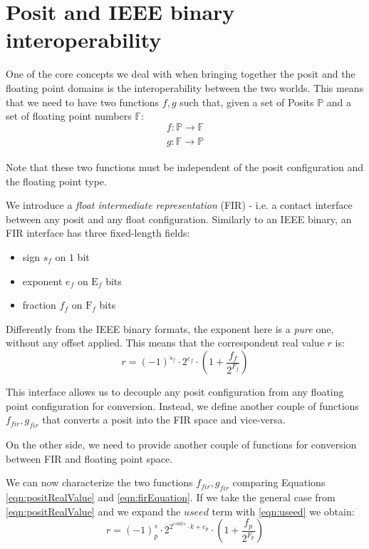 \section{Posit and IEEE binary interoperability}\label{sec:fir}

One of the core concepts we deal with when bringing together the posit and the floating point domains is the interoperability between the two worlds. This means that we need to have two functions $f,g$ such that, given a set of Posits $\mathbb{P}$ and a set of floating point numbers $\mathbb{F}$:
\begin{equation}
    f: \mathbb{P} \xrightarrow[]{} \mathbb{F}
\end{equation}
\begin{equation}
    g: \mathbb{F} \xrightarrow[]{} \mathbb{P}
\end{equation}

Note that these two functions must be independent of the posit configuration  and the floating point type.

We introduce a \textit{float intermediate representation} (FIR) - i.e. a contact interface between any posit and any float configuration. Similarly to an IEEE binary, an FIR interface has three fixed-length fields:
\begin{itemize}
    \item sign $s_f$ on $1$ bit
    \item exponent $e_f$ on $\text{E}_f$ bits
    \item fraction $f_f$ on $\text{F}_f$ bits
\end{itemize}

Differently from the IEEE binary formats, the exponent here is a \textit{pure} one, without any offset applied. This means that the correspondent real value $r$ is:
\begin{equation}\label{eqn:firEquation}
    r = (-1)^{s_f} \cdot 2^{e_f} \cdot \left(1 + \frac{f_f}{2^{F_f}} \right)
\end{equation}

This interface allows us to decouple any posit configuration from any floating point configuration for conversion. Instead, we define another couple of functions $f_{fir}, 
g_{fir}$ that converts a posit into the FIR space and vice-versa.

On the other side, we need to provide another couple of functions for conversion between FIR and floating point space.

We can now characterize the two functions $f_{fir}, g_{fir}$ comparing Equations \eqref{eqn:positRealValue} and \eqref{eqn:firEquation}. If we take the general case from \eqref{eqn:positRealValue} and we expand the $useed$ term with \eqref{eqn:useed} we obtain:
\begin{equation}\label{eqn:positRealExpanded}
    r = (-1)^s_p \cdot 2^{2^{esbits} \cdot k + e_p} \cdot \left ( 1+ \frac{f_p}{2^{F_p}} \right)
\end{equation}

